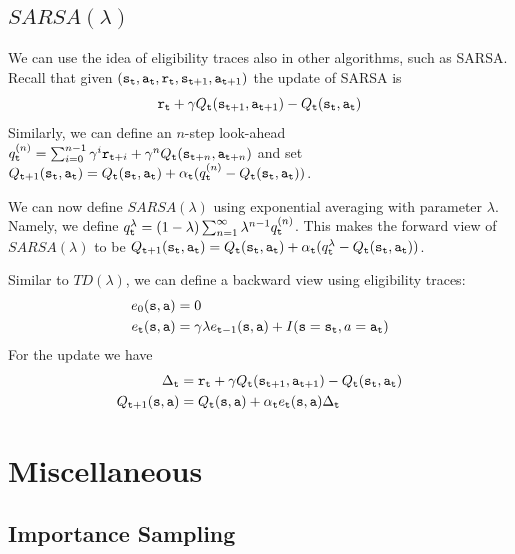 \subsection{$SARSA(\lambda)$}

We can use the idea of eligibility traces also in other algorithms,
such as SARSA. Recall that given
$({\tt s}_{\tt t},{\tt a}_{\tt t},{\tt r}_{\tt t},{\tt s}_{{\tt t}+1},{\tt a}_{{\tt t}+1})$
the update of SARSA is
\[
{\tt r}_{\tt t}+\gamma
Q_{\tt t}({\tt s}_{{\tt t}+1},{\tt a}_{{\tt t}+1})-Q_{\tt t}({\tt s}_{\tt t},{\tt a}_{\tt t})
\]
Similarly, we can define an $n$-step look-ahead
$q^{(n)}_{\tt t}=\sum_{i=0}^{n-1}\gamma^i {\tt r}_{{\tt t}+i}
+\gamma^n Q_{\tt t}({\tt s}_{{\tt t}+n},{\tt a}_{{\tt t}+n})$ and set
$Q_{{\tt t}+1}({\tt s}_{\tt t},{\tt a}_{\tt t})=Q_{\tt t}({\tt s}_{\tt t},{\tt a}_{\tt t})+\alpha_{\tt t}
(q^{(n)}_{\tt t}-Q_{\tt t}({\tt s}_{\tt t},{\tt a}_{\tt t}))$.

We can now define $SARSA(\lambda)$ using exponential averaging with
parameter $\lambda$. Namely, we define
$q^\lambda_{\tt t}=(1-\lambda)\sum_{n=1}^\infty
\lambda^{n-1}q^{(n)}_{{\tt t}}$. This makes the forward view of
$SARSA(\lambda)$ to be
$Q_{{\tt t}+1}({\tt s}_{\tt t},{\tt a}_{\tt t})=Q_{\tt t}({\tt s}_{\tt t},{\tt a}_{\tt t})+\alpha_{\tt t}
(q^{\lambda}_{\tt t}-Q_{\tt t}({\tt s}_{\tt t},{\tt a}_{\tt t}))$.


Similar to $TD(\lambda)$, we can define a backward view using
eligibility traces:
\begin{align*}
e_0({\tt s},{\tt a})&=0\\
e_{\tt t}({\tt s},{\tt a})&=\gamma\lambda
e_{{\tt t}-1}({\tt s},{\tt a})+ I({\tt s}={\tt s}_{\tt t},
a={\tt a}_{\tt t})
\end{align*}
For the update we have
\begin{align*}
\Delta_{\tt t}&= {\tt r}_{\tt t} +\gamma Q_{\tt t}({\tt s}_{{\tt t}+1},{\tt a}_{{\tt t}+1})-Q_{\tt t}({\tt s}_{\tt t},{\tt a}_{\tt t})\\
Q_{{\tt t}+1}({\tt s},{\tt a})&=Q_{{\tt t}}({\tt s},{\tt a})+\alpha_{\tt t}
e_{\tt t}({\tt s},{\tt a})\Delta_{\tt t}
\end{align*}

\section{Miscellaneous}

\subsection{Importance Sampling}

